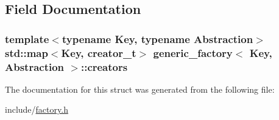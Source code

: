 \subsection{Field Documentation}
\hypertarget{structgeneric__factory_a80aac7cee498bc332fc08e9ef807a8a1}{
\subsubsection[{creators}]{\setlength{\rightskip}{0pt plus 5cm}template$<$typename Key, typename Abstraction$>$ std::map$<$Key, {\bf creator\_\-t}$>$ {\bf generic\_\-factory}$<$ Key, Abstraction $>$::{\bf creators}}}
\label{structgeneric__factory_a80aac7cee498bc332fc08e9ef807a8a1}


The documentation for this struct was generated from the following file:\begin{DoxyCompactItemize}
\item 
include/\hyperlink{factory_8h}{factory.h}\end{DoxyCompactItemize}
